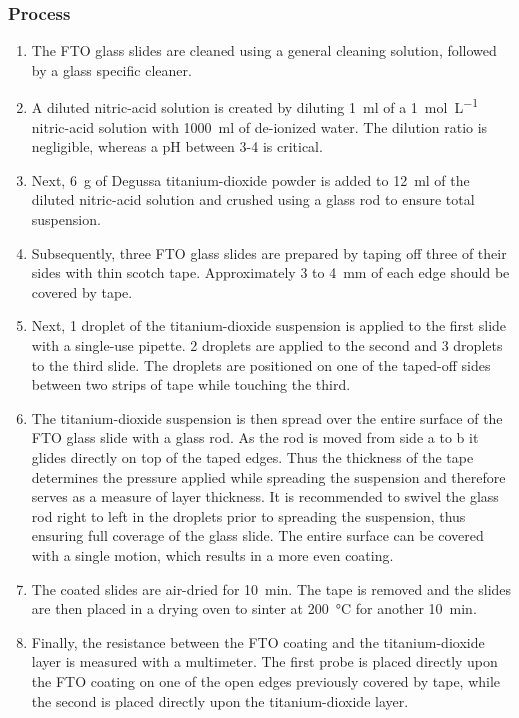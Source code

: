 \subsubsection{Process}
\begin{enumerate}
\item The FTO glass slides are cleaned using a general cleaning solution, followed by a glass specific cleaner.
\item A diluted nitric-acid solution is created by diluting \SI{1}{\ml} of a \SI{1}{\mol\per\L} nitric-acid solution with \SI{1000}{\ml} of de-ionized water. The dilution ratio is negligible, whereas a pH between 3-4 is critical.
\item Next, \SI{6}{\g} of Degussa titanium-dioxide powder is added to \SI{12}{\ml} of the diluted nitric-acid solution and crushed using a glass rod to ensure total suspension.
\item Subsequently, three FTO glass slides are prepared by taping off three of their sides with thin scotch tape. Approximately $3$ to \SI{4}{\mm} of each edge should be covered by tape.
\item Next, 1 droplet of the titanium-dioxide suspension is applied to the first slide with a single-use pipette. 2 droplets are applied to the second and 3 droplets to the third slide. The droplets are positioned on one of the taped-off sides between two strips of tape while touching the third.
\item The titanium-dioxide suspension is then spread over the entire surface of the FTO glass slide with a glass rod. As the rod is moved from side a to b it glides directly on top of the taped edges. Thus the thickness of the tape determines the pressure applied while spreading the suspension and therefore serves as a measure of layer thickness. It is recommended to swivel the glass rod right to left in the droplets prior to spreading the suspension, thus ensuring full coverage of the glass slide. The entire surface can be covered with a single motion, which results in a more even coating.
\item The coated slides are air-dried for \SI{10}{\minute}. The tape is removed and the slides are then placed in a drying oven to sinter at \SI{200}{\degreeCelsius} for another \SI{10}{\minute}.
\item Finally, the resistance between the FTO coating and the titanium-dioxide layer is measured with a multimeter. The first probe is placed directly upon the FTO coating on one of the open edges previously covered by tape, while the second is placed directly upon the titanium-dioxide layer.
\end{enumerate}
            
